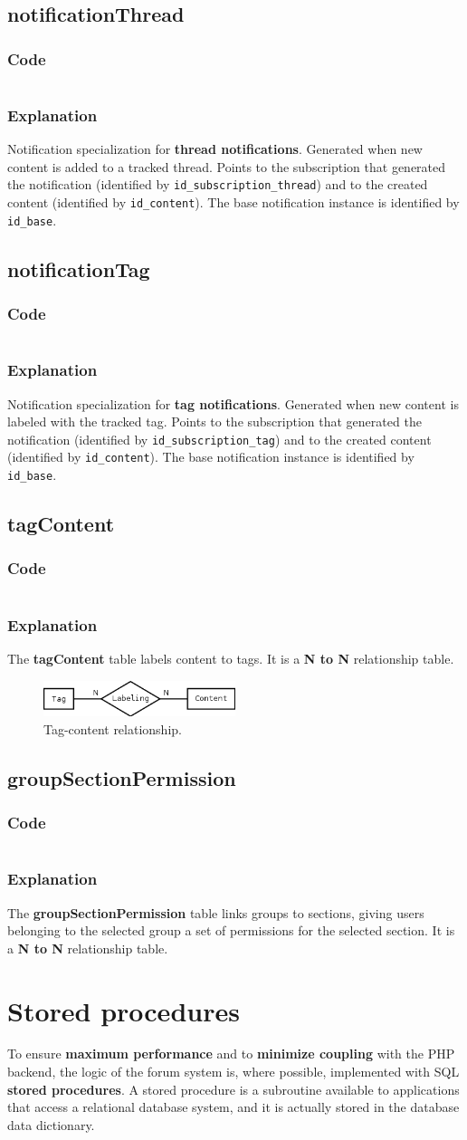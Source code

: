 \documentclass[12pt]{report}
\renewcommand\emph{\textbf}
\newcommand{\printSQLtest}[1]
{
    \inputminted[linenos, breaklines, breakbytoken, tabsize=4, fontsize=\footnotesize]{mysql}{#1}
}
\newcommand{\printSQLTablepage}[2]
{
    \newpage
    \subsection{#2}
    \subsubsection{Code}
    \printSQLtest{../sql/parts/#1}
    \subsubsection{Explanation}
}
\begin{document}
                \printSQLTablepage{17_tblNotificationThread.sql}{notificationThread}
                    Notification specialization for \emph{thread notifications}. Generated when new content is added to a tracked thread. Points to the subscription that generated the notification (identified by \texttt{id_subscription_thread}) and to the created content (identified by \texttt{id_content}).
                    The base notification instance is identified by \texttt{id_base}.

                \printSQLTablepage{18_tblNotificationTag.sql}{notificationTag}
                    Notification specialization for \emph{tag notifications}. Generated when new content is labeled with the tracked tag. Points to the subscription that generated the notification (identified by \texttt{id_subscription_tag}) and to the created content (identified by \texttt{id_content}).
                    The base notification instance is identified by \texttt{id_base}.

                \printSQLTablepage{19_tblTagContent.sql}{tagContent}
                    The \emph{tagContent} table labels content to tags.
                    It is a \emph{N to N} relationship table.

                    \begin{figure}[h]
                    \caption{Tag-content relationship.}
                    \centering
                    \includegraphics[width=0.5\textwidth]{td/19tagcontent}
                    \end{figure}


                \printSQLTablepage{20_tblGroupSectionPermission.sql}{groupSectionPermission}
                    The \emph{groupSectionPermission} table links groups to sections, giving users belonging to the selected group a set of permissions for the selected section.
                    It is a \emph{N to N} relationship table.

            \newpage
            \section{Stored procedures}

                To ensure \emph{maximum performance} and to \emph{minimize coupling} with the PHP backend, the logic of the forum system is, where possible, implemented with SQL \emph{stored procedures}.
                A stored procedure is a subroutine available to applications that access a relational database system, and it is actually stored in the database data dictionary.
\end{document}
